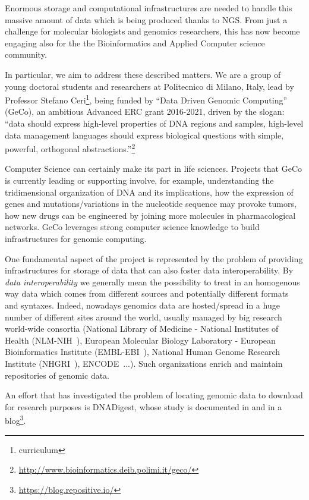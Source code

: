 \documentclass[journal]{IEEEtran}
\begin{document}
Enormous storage and computational infrastructures are needed to handle this massive amount of data which is being produced thanks to NGS. From just a challenge for molecular biologists and genomics researchers, this has now become engaging also for the the Bioinformatics and Applied Computer science community.


In particular, we aim to address these described matters. We are a group of young doctoral students and researchers at Politecnico di Milano, Italy, lead by Professor Stefano Ceri\footnote{curriculum}, being funded by ``Data Driven Genomic Computing'' (GeCo), an ambitious Advanced ERC grant 2016-2021, driven by the slogan: ``data should express high-level properties of DNA regions and samples, high-level data management languages should express biological questions with simple, powerful, orthogonal abstractions.''\footnote{\url{http://www.bioinformatics.deib.polimi.it/geco/}}

Computer Science can certainly make its part in life sciences. Projects that GeCo is currently leading or supporting involve, for example, understanding the tridimensional organization of DNA and its implications, how the expression of genes and mutations/variations in the nucleotide sequence may provoke tumors, how new drugs can be engineered by joining more molecules in pharmacological networks. 
GeCo leverages strong computer science knowledge to build infrastructures for genomic computing.


One fundamental aspect of the project is represented by the problem of providing infrastructures for storage of data that can also foster data interoperability.
By \textit{data interoperability} we generally mean the possibility to treat in an homogenous way data which comes from different sources and potentially different formats and syntaxes.
Indeed, nowadays genomics data are hosted/spread in a huge number of different sites around the world, usually managed by big research world-wide consortia (National Library of Medicine - National Institutes of Health (NLM-NIH~\cite{}), European Molecular Biology Laboratory  - European Bioinformatics Institute (EMBL-EBI~\cite{}), National Human Genome Research Institute (NHGRI~\cite{}), ENCODE~\cite{}...). Such organizations enrich and maintain repositories of genomic data.


An effort that has investigated the problem of locating genomic data to download for research purposes is DNADigest, whose study is documented in \cite{kovalevskaya2016dnadigest} and in a blog\footnote{\url{https://blog.repositive.io/}}.
\end{document}
